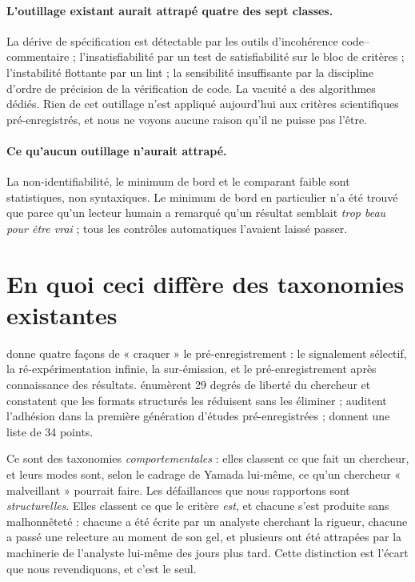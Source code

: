 \documentclass[11pt,a4paper]{article}
\begin{document}
\paragraph{L'outillage existant aurait attrapé quatre des sept classes.} La dérive de
spécification est détectable par les outils d'incohérence code--commentaire ;
l'insatisfiabilité par un test de satisfiabilité sur le bloc de critères ; l'instabilité
flottante par un lint ; la sensibilité insuffisante par la discipline d'ordre de précision de
la vérification de code. La vacuité a des algorithmes dédiés. Rien de cet outillage n'est
appliqué aujourd'hui aux critères scientifiques pré-enregistrés, et nous ne voyons aucune
raison qu'il ne puisse pas l'être.

\paragraph{Ce qu'aucun outillage n'aurait attrapé.} La non-identifiabilité, le minimum de bord
et le comparant faible sont statistiques, non syntaxiques. Le minimum de bord en particulier
n'a été trouvé que parce qu'un lecteur humain a remarqué qu'un résultat semblait \emph{trop
beau pour être vrai} ; tous les contrôles automatiques l'avaient laissé passer.

\section{En quoi ceci diffère des taxonomies existantes}
\label{sec:yamada}

\citet{yamada2018} donne quatre façons de « craquer » le pré-enregistrement : le signalement
sélectif, la ré-expérimentation infinie, la sur-émission, et le pré-enregistrement après
connaissance des résultats. \citet{bakker2020} énumèrent 29 degrés de liberté du chercheur et
constatent que les formats structurés les réduisent sans les éliminer ; \citet{claesen2021}
auditent l'adhésion dans la première génération d'études pré-enregistrées ;
\citet{wicherts2016} donnent une liste de 34 points.

Ce sont des taxonomies \emph{comportementales} : elles classent ce que fait un chercheur, et
leurs modes sont, selon le cadrage de Yamada lui-même, ce qu'un chercheur « malveillant »
pourrait faire. Les défaillances que nous rapportons sont \emph{structurelles}. Elles classent
ce que le critère \emph{est}, et chacune s'est produite sans malhonnêteté : chacune a été
écrite par un analyste cherchant la rigueur, chacune a passé une relecture au moment de son
gel, et plusieurs ont été attrapées par la machinerie de l'analyste lui-même des jours plus
tard. Cette distinction est l'écart que nous revendiquons, et c'est le seul.
\end{document}
